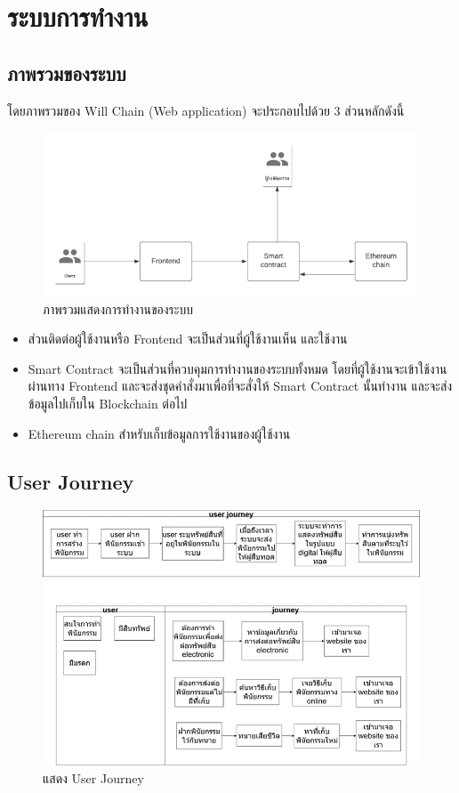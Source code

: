 \documentclass[12pt,oneside,openright,a4paper]{cpe-thai-project}
\begin{document}
\section{ระบบการทำงาน}
\subsection{ภาพรวมของระบบ}
\tab โดยภาพรวมของ Will Chain (Web application) จะประกอบไปด้วย 3 ส่วนหลักดังนี้
	\begin{figure}[h]
		\centering
		\includegraphics[scale=0.8]{Overall_system}
		\caption{ภาพรวมแสดงการทำงานของระบบ}
	\end{figure}
	\begin{itemize}[leftmargin=0pt,itemindent=2.5cm]
		\item ส่วนติดต่อผู้ใช้งานหรือ Frontend จะเป็นส่วนที่ผู้ใช้งานเห็น และใช้งาน
		\item Smart Contract จะเป็นส่วนที่ควบคุมการทำงานของระบบทั้งหมด โดยที่ผู้ใช้งานจะเข้าใช้งานผ่านทาง Frontend และจะส่งชุดคำสั่งมาเพื่อที่จะสั่งให้ Smart Contract นั้นทำงาน และจะส่งข้อมูลไปเก็บใน Blockchain ต่อไป
		\item Ethereum chain สำหรับเก็บข้อมูลการใช้งานของผู้ใช้งาน
	\end{itemize}

\subsection{User Journey}
	\begin{figure}[h]
		\centering
		\includegraphics[scale=0.9]{UserJourney}
		\caption{แสดง User Journey}
	\end{figure}
\FloatBarrier
\hfill\\
\hfill\\
\hfill\\
\end{document}
